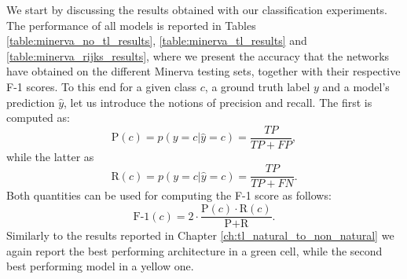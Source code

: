 We start by discussing the results obtained with our classification experiments. The performance of all models is reported in Tables \ref{table:minerva_no_tl_results}, \ref{table:minerva_tl_results} and \ref{table:minerva_rijks_results}, where we present the accuracy that the networks have obtained on the different Minerva testing sets, together with their respective F-1 scores. To this end for a given class $c$, a ground truth label $y$ and a model's prediction $\hat{y}$, let us introduce the notions of precision and recall. The first is computed as:
\begin{equation}
	\text{P}(c)=p(y=c|\hat{y}=c)=\frac{TP}{TP+FP},
\end{equation}
while the latter as
\begin{equation}
	\text{R}(c)=p(y=c|\hat{y}=c)=\frac{TP}{TP+FN}.
\end{equation}
Both quantities can be used for computing the F-1 score as follows:
\begin{equation}
	\text{F-1}(c)=2 \cdot \frac{\text{P}(c)\cdot\text{R}(c)}{\text{P}+\text{R}}.
\end{equation}
Similarly to the results reported in Chapter \ref{ch:tl_natural_to_non_natural} we again report the best performing architecture in a green cell, while the second best performing model in a yellow one.  

